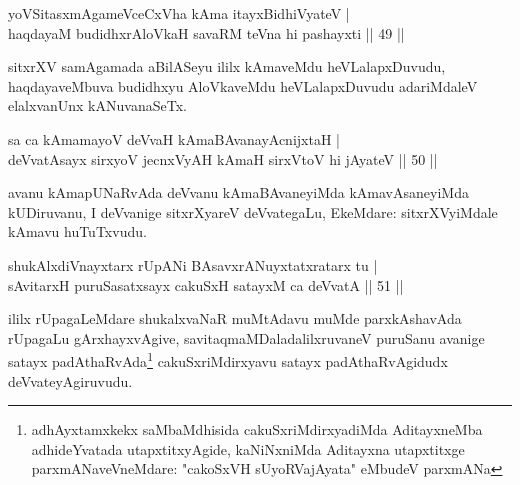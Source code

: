 
\begin{shl}
yoVSitasxmAgameVceCxVha kAma itayxBidhiVyateV |\\
haqdayaM budidhxrAloVkaH savaRM teVna hi pashayxti \hfill || 49 ||
\end{shl}

\begin{artha}
sitxrXV samAgamada aBilASeyu ililx kAmaveMdu heVLalapxDuvudu, haqdayaveMbuva budidhxyu AloVkaveMdu heVLalapxDuvudu adariMdaleV elalxvanUnx kANuvanaSeTx.
\end{artha}

\begin{shl}
sa ca kAmamayoV deVvaH kAmaBAvanayA\s cnijxtaH |\\
deVvatA\s sayx sirxyoV jecnxVyAH kAmaH sirxVtoV hi jAyateV \hfill || 50 ||
\end{shl}

\begin{artha}
avanu kAmapUNaRvAda deVvanu kAmaBAvaneyiMda kAmavAsaneyiMda kUDiruvanu, I deVvanige sitxrXyareV deVvategaLu, EkeMdare: sitxrXVyiMdale kAmavu huTuTxvudu.
\end{artha}





\begin{shl}
shukAlxdiVnayxtarx rUpANi BAsavxrANuyxtatxratarx tu |\\
sAvitarxH puruSasatxsayx cakuSxH satayxM ca deVvatA \hfill || 51 ||
\end{shl}

\begin{artha}
ililx rUpagaLeMdare shukalxvaNaR muMtAdavu muMde parxkAshavAda rUpagaLu gArxhayxvAgive, savitaqmaMDaladalilxruvaneV puruSanu avanige satayx padAthaRvAda\footnote{adhAyxtamxkekx saMbaMdhisida cakuSxriMdirxyadiMda AditayxneMba adhideYvatada utapxtitxyAgide, kaNiNxniMda Aditayxna utapxtitxge parxmANaveVneMdare: "cakoSxVH sUyoRVajAyata" eMbudeV parxmANa} cakuSxriMdirxyavu satayx padAthaRvAgidudx deVvateyAgiruvudu.
\end{artha}

